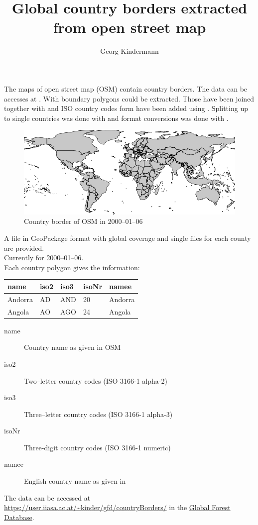 \documentclass{scrartcl}
\title{Global country borders extracted from open street map}
\author{Georg Kindermann}
\begin{document}
\maketitle

The maps of open street map (OSM) contain country borders. The data
can be accesses at \cite{osmPlanet}. With \cite{andGem} boundary
polygons could be extracted. Those have been joined together with
\cite{GRASS_GIS_software} and ISO country codes form \cite{wikiIso}
have been added using \cite{sqlite2020hipp}. Splitting up to single
countries was done with \cite{QGIS_software} and format conversions
was done with \cite{gdal}.

\begin{figure}[htbp]
  \centering
  \includegraphics[width=.9\linewidth]{map.png}
  \caption{Country border of OSM in 2000--01--06}
  \label{fig:map}
\end{figure}

A file in GeoPackage format with global coverage and single files for
each county are provided.\\
Currently for 2000--01--06.\\
Each country polygon gives the information:

\begin{tabular}{lllll}
  name & iso2 & iso3 & isoNr & namee\\
  \hline
Andorra & AD  & AND  &    20 & Andorra\\
Angola  & AO  & AGO  &    24 & Angola\\
\end{tabular}

\begin{description}
\item[name] Country name as given in OSM
\item[iso2] Two--letter country codes (ISO 3166-1 alpha-2)
\item[iso3] Three--letter country codes (ISO 3166-1 alpha-3)
\item[isoNr] Three-digit country codes (ISO 3166-1 numeric)
\item[namee] English country name as given in \cite{wikiIso}
\end{description}

The data can be accessed at
\url{https://user.iiasa.ac.at/~kinder/gfd/countryBorders/} in the
\href{https://iiasa.ac.at/models-and-data/global-forest-database}{Global
  Forest Database}.



\end{document}
